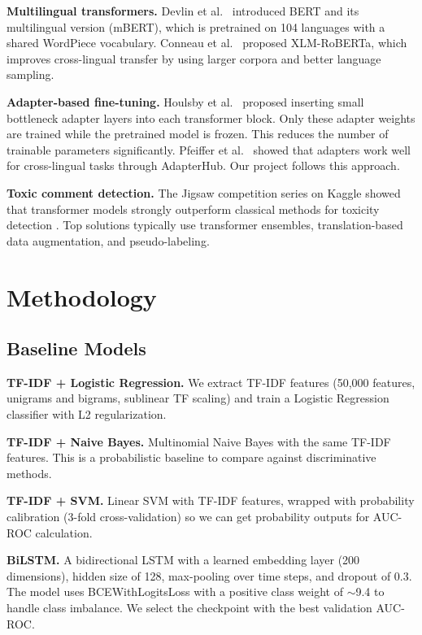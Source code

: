 \documentclass[11pt,a4paper]{article}
\begin{document}
\textbf{Multilingual transformers.}
Devlin et al.\ \cite{devlin2019} introduced BERT and its multilingual version
(mBERT), which is pretrained on 104 languages with a shared WordPiece
vocabulary. Conneau et al.\ \cite{conneau2020} proposed XLM-RoBERTa, which
improves cross-lingual transfer by using larger corpora and better language
sampling.

\textbf{Adapter-based fine-tuning.}
Houlsby et al.\ \cite{houlsby2019} proposed inserting small bottleneck adapter
layers into each transformer block. Only these adapter weights are trained while
the pretrained model is frozen. This reduces the number of trainable parameters
significantly. Pfeiffer et al.\ \cite{pfeiffer2020} showed that adapters work
well for cross-lingual tasks through AdapterHub. Our project follows this
approach.

\textbf{Toxic comment detection.}
The Jigsaw competition series on Kaggle showed that transformer models strongly
outperform classical methods for toxicity detection \cite{risch2020}. Top
solutions typically use transformer ensembles, translation-based data
augmentation, and pseudo-labeling.

\section{Methodology}

\subsection{Baseline Models}

\textbf{TF-IDF + Logistic Regression.}
We extract TF-IDF features (50,000 features, unigrams and bigrams, sublinear TF
scaling) and train a Logistic Regression classifier with L2 regularization.

\textbf{TF-IDF + Naive Bayes.}
Multinomial Naive Bayes with the same TF-IDF features. This is a probabilistic
baseline to compare against discriminative methods.

\textbf{TF-IDF + SVM.}
Linear SVM with TF-IDF features, wrapped with probability calibration (3-fold
cross-validation) so we can get probability outputs for AUC-ROC calculation.

\textbf{BiLSTM.}
A bidirectional LSTM with a learned embedding layer (200 dimensions), hidden
size of 128, max-pooling over time steps, and dropout of 0.3. The model uses
BCEWithLogitsLoss with a positive class weight of $\sim$9.4 to handle class
imbalance. We select the checkpoint with the best validation AUC-ROC.
\end{document}
